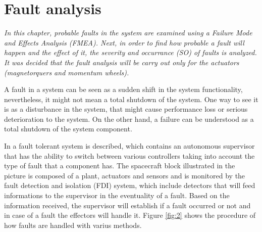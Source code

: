 \chapter{Fault  analysis}
\textit{In this chapter, probable faults in the system are examined using a Failure Mode and Effects Analysis (FMEA). Next, in order to find how probable a fault will happen and the effect of it, the severity and occurrance (SO) of faults is analyzed. It was decided that the fault analysis will be carry out only for the actuators (magnetorquers and momentum wheels).}

A fault in a system can be seen as a sudden shift in the system functionality, nevertheless, it might not mean a total shutdown of the system. One way to see it is as a disturbance in the system, that might cause performance loss or serious deterioration to the system. On the other hand, a failure can be understood as a total shutdown of the system component. 

In  a fault tolerant system is described, which contains an autonomous supervisor that has the ability to switch between various controllers taking into account the type of fault that a component has. The spacecraft block illustrated in the picture is composed of a plant, actuators and sensors and is monitored by the fault detection and isolation (FDI) system, which include detectors that will feed informations to the supervisor in the eventuality of a fault. Based on the information received, the supervisor will establish if a fault occurred or not and in case of a fault the effectors will handle it. Figure \ref{fig:2} shows the procedure of how faults are handled with varius methods.

